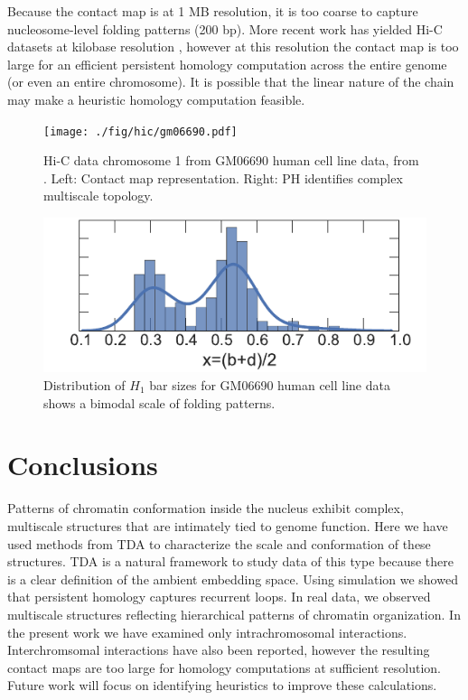 Because the contact map is at 1 MB resolution, it is too coarse to capture nucleosome-level folding patterns (200 bp).
More recent work has yielded Hi-C datasets at kilobase resolution \cite{Jin:2013hm,Rao:2014eo}, however at this resolution the contact map is too large for an efficient persistent homology computation across the entire genome (or even an entire chromosome).
It is possible that the linear nature of the chain may make a heuristic homology computation feasible.

\begin{figure}
       \centering
       \texttt{[image: ./fig/hic/gm06690.pdf]}
       \caption[Hi-C Contact Map and Persistent Homology for GM06690 Cell Line Data]{Hi-C data chromosome 1 from GM06690 human cell line data, from \cite{LiebermanAiden:2009jz}. Left: Contact map representation. Right: PH identifies complex multiscale topology.}
       \label{fig:human_data}
\end{figure}

\begin{figure}
       \centering
       \includegraphics[width=\columnwidth]{./fig/hic/gm06690_barsizes_v2.pdf}
       \caption[Distribution of $H_1$ Features for GM06690 Data]{Distribution of $H_1$ bar sizes for GM06690 human cell line data shows a bimodal scale of folding patterns.}
       \label{fig:human_data_histogram}
\end{figure}

\section{Conclusions}
\label{sec:conclusions}
%
Patterns of chromatin conformation inside the nucleus exhibit complex, multiscale structures that are intimately tied to genome function.
Here we have used methods from TDA to characterize the scale and conformation of these structures.
TDA is a natural framework to study data of this type because there is a clear definition of the ambient embedding space.
Using simulation we showed that persistent homology captures recurrent loops.
In real data, we observed multiscale structures reflecting hierarchical patterns of chromatin organization.
In the present work we have examined only intrachromosomal interactions.
Interchromsomal interactions have also been reported, however the resulting contact maps are too large for homology computations at sufficient resolution.
Future work will focus on identifying heuristics to improve these calculations.